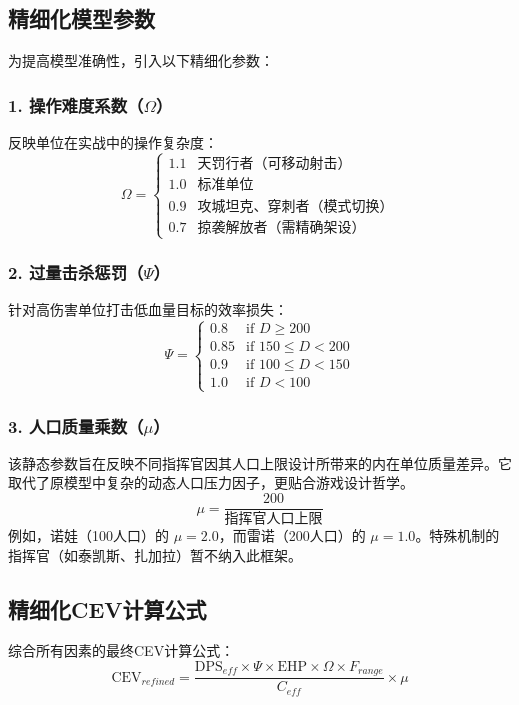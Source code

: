 \documentclass[a4paper,12pt]{article}
\begin{document}
\subsection{精细化模型参数}

为提高模型准确性，引入以下精细化参数：

\subsubsection{1. 操作难度系数（$\Omega$）}
反映单位在实战中的操作复杂度：
\begin{equation}
\Omega = \begin{cases}
1.1 & \text{天罚行者（可移动射击）} \\
1.0 & \text{标准单位} \\
0.9 & \text{攻城坦克、穿刺者（模式切换）} \\
0.7 & \text{掠袭解放者（需精确架设）}
\end{cases}
\end{equation}

\subsubsection{2. 过量击杀惩罚（$\Psi$）}
针对高伤害单位打击低血量目标的效率损失：
\begin{equation}
\Psi = \begin{cases}
0.8 & \text{if } D \geq 200 \\
0.85 & \text{if } 150 \leq D < 200 \\
0.9 & \text{if } 100 \leq D < 150 \\
1.0 & \text{if } D < 100
\end{cases}
\end{equation}

\subsubsection{3. 人口质量乘数（$\mu$）}
该静态参数旨在反映不同指挥官因其人口上限设计所带来的内在单位质量差异。它取代了原模型中复杂的动态人口压力因子，更贴合游戏设计哲学。
\begin{equation}
\mu = \frac{200}{\text{指挥官人口上限}}
\end{equation}
例如，诺娃（100人口）的 $\mu=2.0$，而雷诺（200人口）的 $\mu=1.0$。特殊机制的指挥官（如泰凯斯、扎加拉）暂不纳入此框架。

\subsection{精细化CEV计算公式}
综合所有因素的最终CEV计算公式：
\begin{equation}
\text{CEV}_{refined} = \frac{\text{DPS}_{eff} \times \Psi \times \text{EHP} \times \Omega \times F_{range}}{C_{eff}} \times \mu
\end{equation}
\end{document}
